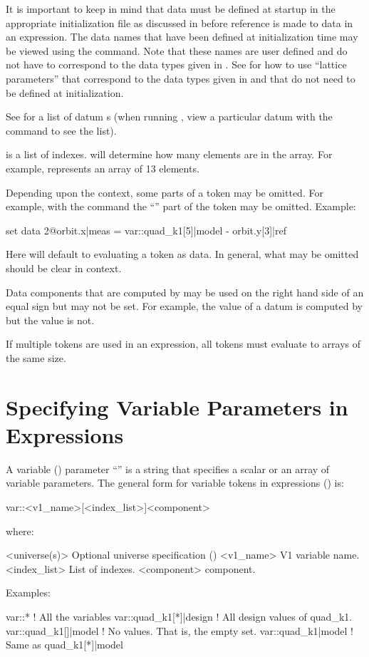 It is important to keep in mind that data must be defined at startup in the appropriate
initialization file as discussed in  before reference is made to data in an
expression. The  data names that have been defined at initialization time may be
viewed using the  command. Note that these names are user defined and do not have to
correspond to the data types given in . See  for how to use
``lattice parameters'' that correspond to the data types given in  and that do
not need to be defined at initialization.

See  for a list of datum s (when running \tao, view a
particular datum with the  command to see the list).

 is a list of indexes.  will determine how many elements are in
the array. For example,  represents an array of 13 elements.

Depending upon the context, some parts of a token may be omitted. For example, with the  command the ``'' part of the token may be omitted.  Example:
\begin{example}
  set data 2@orbit.x|meas = var::quad_k1[5]|model - orbit.y[3]|ref
\end{example}
Here \tao will default to evaluating a token as data. In general, what may be omitted
should be clear in context.

Data components that are computed by \tao may be used on the right hand side of an equal sign but
may not be set. For example, the  value of a datum is computed by \tao but the 
value is not.

If multiple tokens are used in an expression, all tokens must evaluate to arrays of the same size.

\section{Specifying Variable Parameters in Expressions}
\label{s:var.token}

A variable () parameter ``'' is a string that specifies a scalar or an array
of variable parameters. The general form for variable tokens in expressions
() is:
\begin{example}
  var::<v1_name>[<index_list>]<component>
\end{example}
where:
\begin{example}
  <universe(s)>       Optional universe specification ()
  <v1_name>           V1 variable name.
  <index_list>        List of indexes.
  <component>         component. 
\end{example}
Examples:
\begin{example}
  var::*                     ! All the variables
  var::quad_k1[*]|design     ! All design values of quad_k1.
  var::quad_k1[]|model       ! No values. That is, the empty set.
  var::quad_k1|model         ! Same as quad_k1[*]|model
\end{example}

